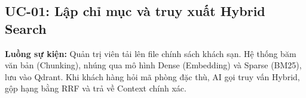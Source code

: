 \subsection{UC-01: Lập chỉ mục và truy xuất Hybrid Search}
\textbf{Luồng sự kiện:} Quản trị viên tải lên file chính sách khách sạn. Hệ thống băm văn bản (Chunking), nhúng qua mô hình Dense (Embedding) và Sparse (BM25), lưu vào Qdrant. Khi khách hàng hỏi mã phòng đặc thù, AI gọi truy vấn Hybrid, gộp hạng bằng RRF và trả về Context chính xác.
